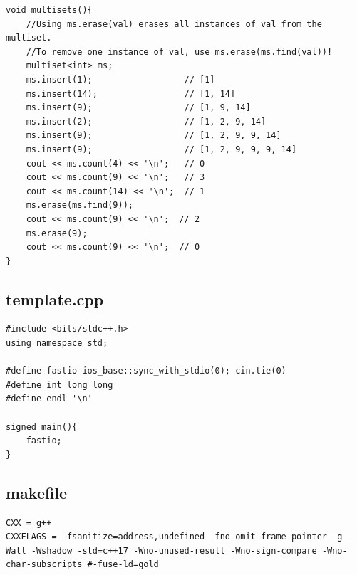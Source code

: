 \documentclass[11pt, a4paper, twoside]{article}
\begin{document}
\begin{lstlisting}
void multisets(){
    //Using ms.erase(val) erases all instances of val from the multiset. 
    //To remove one instance of val, use ms.erase(ms.find(val))!
    multiset<int> ms;
    ms.insert(1);                  // [1]
    ms.insert(14);                 // [1, 14]
    ms.insert(9);                  // [1, 9, 14]
    ms.insert(2);                  // [1, 2, 9, 14]
    ms.insert(9);                  // [1, 2, 9, 9, 14]
    ms.insert(9);                  // [1, 2, 9, 9, 9, 14]
    cout << ms.count(4) << '\n';   // 0
    cout << ms.count(9) << '\n';   // 3
    cout << ms.count(14) << '\n';  // 1
    ms.erase(ms.find(9));
    cout << ms.count(9) << '\n';  // 2
    ms.erase(9);
    cout << ms.count(9) << '\n';  // 0
}
\end{lstlisting}

\subsection{template.cpp}
\begin{lstlisting}
#include <bits/stdc++.h>
using namespace std;

#define fastio ios_base::sync_with_stdio(0); cin.tie(0)
#define int long long
#define endl '\n'

signed main(){
	fastio;
}
\end{lstlisting}

\subsection{makefile}
\begin{lstlisting}
CXX = g++
CXXFLAGS = -fsanitize=address,undefined -fno-omit-frame-pointer -g -Wall -Wshadow -std=c++17 -Wno-unused-result -Wno-sign-compare -Wno-char-subscripts #-fuse-ld=gold
\end{lstlisting}
\end{document}
